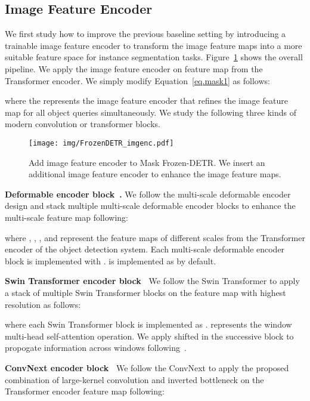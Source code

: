 \documentclass[10pt,twocolumn,letterpaper]{article}
\begin{document}
\subsection{Image Feature Encoder}

We first study how to improve the previous baseline setting by introducing a trainable image feature encoder to transform the image feature maps into a more suitable feature space for instance segmentation tasks.
Figure~\ref{fig:frozen_detr_pipeline_2} shows the overall pipeline. We apply the image feature encoder on feature map  from the Transformer encoder. We simply modify Equation~\ref{eq.mask1} as follows:


where the  represents the image feature encoder that refines the image feature map for all object queries simultaneously.
We study the following three kinds of modern convolution or transformer blocks.


\begin{figure}[t]
\centering
\texttt{[image: img/FrozenDETR\_imgenc.pdf]}
\caption{\small{Add image feature encoder to Mask Frozen-DETR. We insert an additional image feature encoder to enhance the image feature maps.}}
\label{fig:frozen_detr_pipeline_2}
\end{figure}


\vspace{1mm}
\noindent\textbf{Deformable encoder block~\cite{zhu2020deformable}.}
We follow the multi-scale deformable encoder design and stack multiple multi-scale deformable encoder blocks to enhance the multi-scale feature map  following:

where , , , and  represent the feature maps of different scales from the Transformer encoder of the object detection system.
Each multi-scale deformable encoder block is implemented with .
 is implemented as  by default.


\vspace{1mm}
\noindent\textbf{Swin Transformer encoder block~\cite{liu2021swin}}
We follow the Swin Transformer to apply a stack of multiple Swin Transformer blocks on the feature map  with highest resolution as follows:

where each Swin Transformer block is implemented as .  represents the window multi-head self-attention operation.
We apply shifted  in the successive block to propogate information across windows following~\cite{liu2021swin}.

\vspace{1mm}
\noindent\textbf{ConvNext encoder block~\cite{liu2022convnet}}
We follow the ConvNext to apply the proposed combination of large-kernel convolution and inverted bottleneck on the Transformer encoder feature map  following:
\end{document}
